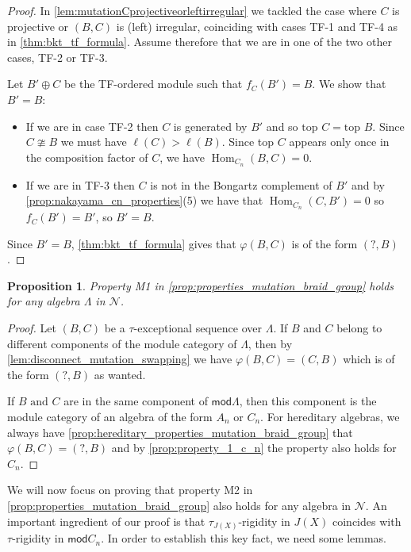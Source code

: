 \documentclass[11pt]{amsart}
\newcommand{\mods}{\mathsf{mod}}
\DeclareMathOperator{\Hom}{\mathrm{Hom}}
\newtheorem{proposition}[theorem]{Proposition}
\theoremstyle{definition}
\begin{document}
\begin{proof}
    In \cref{lem:mutationCprojectiveorleftirregular} we tackled the case where $C$ is projective or $(B,C)$ is (left) irregular, coinciding with cases TF-1 and TF-4 as in \cref{thm:bkt_tf_formula}. Assume therefore that we are in one of the two other cases, TF-2 or TF-3.

    Let $B' \oplus C$ be the TF-ordered module such that $f_C(B') = B$. We show that $B' = B$:

    \begin{itemize}
        \item If we are in case TF-2 then $C$ is generated by $B'$ and so $\text{top } C = \text{top } B$. Since $C \ncong B$ we must have $\ell(C) > \ell(B)$. Since top $C$ appears only once in the composition factor of $C$, we have $\Hom_{C_n}(B,C) = 0$.
        
        \item If we are in TF-3 then $C$ is not in the Bongartz complement of $B'$ and by \cref{prop:nakayama_cn_properties}(5) we have that $\Hom_{C_n}(C,B') = 0$ so $f_C(B') = B'$, so $B' = B$.
    \end{itemize}

    Since $B' = B$, \cref{thm:bkt_tf_formula} gives that $\varphi(B,C)$ is of the form $(?,B)$.
\end{proof}

\begin{proposition}\label{prop:property_1_n}
    Property M1 in \cref{prop:properties_mutation_braid_group} holds for any algebra $\Lambda$ in $\mathcal{N}$.
\end{proposition}

\begin{proof}
    Let $(B,C)$ be a $\tau$-exceptional sequence over $\Lambda$. If $B$ and $C$ belong to different components of the module category of $\Lambda$, then by \cref{lem:disconnect_mutation_swapping} we have $\varphi(B,C) = (C,B)$ which is of the form $(?,B)$ as wanted.

    If $B \text{ and }C$ are in the same component of $\mods \Lambda$, then this component is the module category of an algebra of the form $A_n$ or $C_n$. For hereditary algebras, we always have \cref{prop:hereditary_properties_mutation_braid_group} that $\varphi(B,C) = (?,B)$ and by \cref{prop:property_1_c_n} the property also holds for $C_n$.
\end{proof}

We will now focus on proving that property M2 in \cref{prop:properties_mutation_braid_group} also holds for any algebra in $\mathcal{N}$. An important ingredient of our proof is that $\tau_{J(X)}$-rigidity in $J(X)$ coincides with $\tau$-rigidity in $\mods C_n$. In order to establish this key fact, we need some lemmas.
\end{document}
